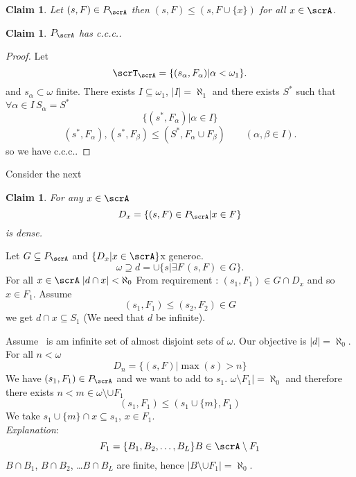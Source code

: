 \documentclass[11pt,pdftex,twoside,a4paper]{article}
\newcommand{\ccc}{c.c.c.}
\newtheorem{claim}[thm]{Claim}
\begin{document}
\begin{claim}
Let \((s,F)\in P_\scrA\)
then 
\((s,F)\leq (s,F\cup\{x\})\)
for all \(x\in\scrA\).
\end{claim}

\begin{claim}
\(P_\scrA\) has \ccc.
\end{claim}
\begin{proof}
Let 
\begin{equation*}
\scrT_\scrA = \{(s_\alpha, F_\alpha)|\alpha < \omega_1\}.
\end{equation*}
and \(s_\alpha \subset \omega\) finite.
There exists \(I \subseteq \omega_1\), \(|I| = \aleph_1\)
and there exists \(S^*\) such that \(\forall \alpha\in I\, S_\alpha=S^*\)
\begin{equation*}
\{(s^*,F_\alpha)| \alpha\in I\}
\end{equation*}
\begin{equation*}
(s^*,F_\alpha),(s^*,F_\beta) \leq (S^*,F_\alpha\cup F_\beta)
   \qquad (\alpha,\beta\in I).
\end{equation*}
so we have \ccc.
\end{proof}

Consider the next
\begin{claim}
For any \(x\in \scrA\)
\begin{equation*}
D_x = \{(s, F)\in P_\scrA | x\in F\}
\end{equation*}
is dense.
\end{claim}
Let \(G\subseteq P_\scrA\) and \(\{D_x|x\in\scrA\}\)x generoc.
\begin{equation*}
 \omega \supseteq d = \cup \{s|\exists F\,(s,F)\in G\}.
\end{equation*}
For all \(x\in \scrA \; |d\cap x| < \aleph_0\)
From requirement : \((s_1,F_1) \in G\cap D_x\) and so \(x\in F_1\).
Assume
\begin{equation*}
 (s_1,F_1) \leq (s_2,F_2) \in G
\end{equation*}
we get \(d\cap x\subseteq S_1\)
(We need that $d$ be infinite).

Assume \scrA\ is am infinite set of almost disjoint sets of \(\omega\).
Our objective is \(|d|=\aleph_0\).
For all \(n < \omega\)
\begin{equation*}
D_n = \{(s,F)| \max(s)>n\} %
\end{equation*}
We have \((s_1,F_1)\in P_\scrA\)
and we want to add to \(s_1\).
\(\omega \setminus F_1| = \aleph_0\) and therefore
there exists \(n < m \in \omega \setminus \cup F_1\)
\begin{equation*}
(s_1,F_1) \leq (s_1\cup\{m\}, F_1)
\end{equation*}
We take \(s_1\cup\{m\}\cap x \subseteq s_1\), \(x \in F_1\).
\\
\emph{Explanation}:
\begin{equation*}
 F_1 = \{B_1,B_2,\ldots, B_L\}\\
B \in \scrA \setminus F_1 \\
\end{equation*}
\(B\cap B_1\), \(B\cap B_2\), \ldots \(B\cap B_L\) are finite,
hence \(|B \setminus \cup F_1| = \aleph_0\).
\end{document}
